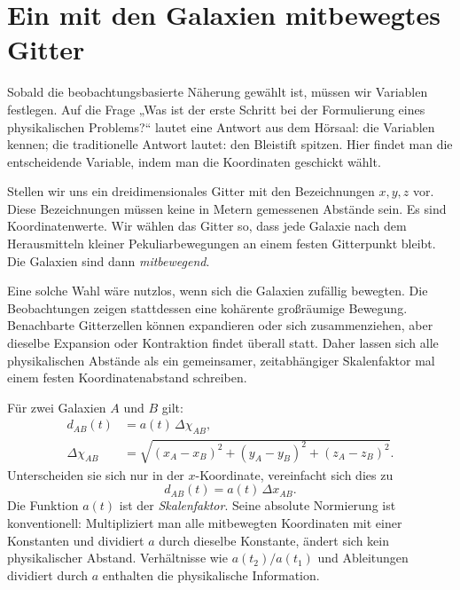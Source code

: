 \begin{classroomqa}
\end{classroomqa}

\section{Ein mit den Galaxien mitbewegtes Gitter}

Sobald die beobachtungsbasierte Näherung gewählt ist, müssen wir Variablen festlegen. Auf die Frage „Was ist der erste Schritt bei der Formulierung eines physikalischen Problems?“ lautet eine Antwort aus dem Hörsaal: die Variablen kennen; die traditionelle Antwort lautet: den Bleistift spitzen. Hier findet man die entscheidende Variable, indem man die Koordinaten geschickt wählt.

Stellen wir uns ein dreidimensionales Gitter mit den Bezeichnungen \(x,y,z\) vor. Diese Bezeichnungen müssen keine in Metern gemessenen Abstände sein. Es sind Koordinatenwerte. Wir wählen das Gitter so, dass jede Galaxie nach dem Herausmitteln kleiner Pekuliarbewegungen an einem festen Gitterpunkt bleibt. Die Galaxien sind dann \emph{mitbewegend}.

Eine solche Wahl wäre nutzlos, wenn sich die Galaxien zufällig bewegten. Die Beobachtungen zeigen stattdessen eine kohärente großräumige Bewegung. Benachbarte Gitterzellen können expandieren oder sich zusammenziehen, aber dieselbe Expansion oder Kontraktion findet überall statt. Daher lassen sich alle physikalischen Abstände als ein gemeinsamer, zeitabhängiger Skalenfaktor mal einem festen Koordinatenabstand schreiben.

Für zwei Galaxien \(A\) und \(B\) gilt:
\begin{equation}
\begin{aligned}
d_{AB}(t)&=a(t)\,\Delta\chi_{AB},\\
\Delta\chi_{AB}
&=\sqrt{(x_A-x_B)^2+(y_A-y_B)^2+(z_A-z_B)^2}.
\end{aligned}
\label{eq:c01-physical-distance}
\end{equation}
Unterscheiden sie sich nur in der \(x\)-Koordinate, vereinfacht sich dies zu
\begin{equation}
d_{AB}(t)=a(t)\,\Delta x_{AB}.
\end{equation}
Die Funktion \(a(t)\) ist der \emph{Skalenfaktor}. Seine absolute Normierung ist konventionell: Multipliziert man alle mitbewegten Koordinaten mit einer Konstanten und dividiert \(a\) durch dieselbe Konstante, ändert sich kein physikalischer Abstand. Verhältnisse wie \(a(t_2)/a(t_1)\) und Ableitungen dividiert durch \(a\) enthalten die physikalische Information.

